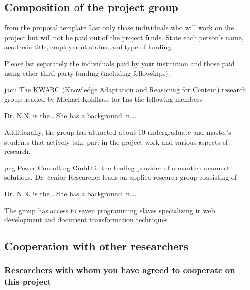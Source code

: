 \subsection{Composition of the project group }

\begin{todo}{from the proposal template}
  List only those individuals who will work on the project but will not be paid out of the
  project funds. State each person’s name, academic title, employment status, and type of
  funding.

  Please list separately the individuals paid by your institution and those paid using
  other third-party funding (including fellowships).
\end{todo}

\begin{sitedescription}{jacu}
  The KWARC (Knowledge Adaptation and Reasoning for Content) research group headed by
  Michael Kohlhase for has the following members
  \begin{compactdesc}
  \item[Dr. N.N.] is the \ldots She has a background in\ldots.
  \end{compactdesc}
  Additionally, the group has attracted about 10 undergraduate and master's students that
  actively take part in the project work and various aspects of research.
\end{sitedescription}

\begin{sitedescription}{pcg}
  Power Consulting GmbH is the leading provider of semantic document solutions. Dr. Senior
  Researcher leads an applied research group consisting of
  \begin{compactdesc}
  \item[Dr. N.N.] is the \ldots She has a background in\ldots.
  \end{compactdesc}
  The group has access to seven programming slaves specializing in web development and
  document transformation techniques
\end{sitedescription}


\subsection{Cooperation with other researchers }

\subsubsection{Researchers with whom you have agreed to cooperate on this project
  }

